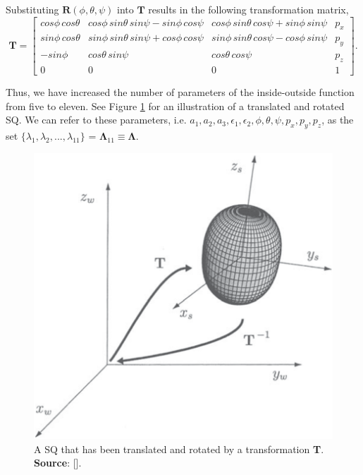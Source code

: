 Substituting $\textbf{R}(\phi,\theta,\psi)$ into $\textbf{T}$ results in the following transformation matrix,
\begin{equation}
\textbf{T} = \begin{bmatrix}
cos\phi\,cos\theta & cos\phi\,sin\theta\,sin\psi - sin\phi\,cos\psi &
cos\phi\,sin\theta\,cos\psi + sin\phi\,sin\psi & p_x \\ sin\phi\,cos\theta & sin\phi\,sin\theta\,sin\psi + cos\phi\,cos\psi & sin\phi\,sin\theta\,cos\psi - cos\phi\,sin\psi & p_y\\ -sin\phi& cos\theta\,sin\psi& cos\theta\,cos\psi& p_z\\0 & 0 & 0 & 1
\end{bmatrix}.
\label{eq:T}
\end{equation}


Thus, we have increased the number of parameters of the inside-outside function from five to eleven. See Figure \ref{fig:SQ_transrot} for an illustration of a translated and rotated \gls{SQ}.  We can refer to these parameters, i.e. $a_1, a_2, a_3, \epsilon_1, \epsilon_2, \phi, \theta, \psi, p_x, p_y, p_z$, as the set $\{\lambda_1, \lambda_2, ..., \lambda_{11}\}$ = $\mathbf{\Lambda}_{11} \equiv \mathbf{\Lambda}$.
\begin{figure}[h]
	\centering
	\includegraphics[width=0.35\textheight]{import/SQ_transrot}
	\caption{A SQ that has been translated and rotated by a transformation \textbf{T}. \textbf{Source}: [\citeauthor{Jaklic2000}].}
	\label{fig:SQ_transrot}
\end{figure}

